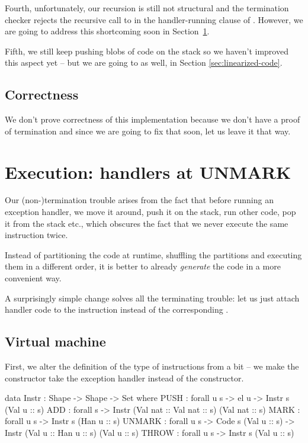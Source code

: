 Fourth, unfortunately, our recursion is still not structural and the
termination checker rejects the recursive call to  in the
handler-running clause of . However, we are going to address
this shortcoming soon in Section~\ref{sec:handlers-at-unmark}.

Fifth, we still keep pushing blobs of code on the stack so we haven't improved
this aspect yet -- but we are going to as well, in Section \ref{sec:linearized-code}.

\subsection{Correctness}

We don't prove correctness of this implementation because we don't
have a proof of termination and since we are going to fix that soon, let us
leave it that way.

\section{Execution: handlers at UNMARK}
\label{sec:handlers-at-unmark}

Our (non-)termination trouble arises from the fact that before running an
exception handler, we move it around, push it on the stack, run other code, pop
it from the stack etc., which obscures the fact that we never execute the same
instruction twice.

Instead of partitioning the code at runtime, shuffling the partitions and
executing them in a different order, it is better to already \emph{generate}
the code in a more convenient way.

A surprisingly simple change solves all the terminating trouble: let us just
attach handler code to the instruction  instead of the
corresponding .


\subsection{Virtual machine}

First, we alter the definition of the type of instructions from
 a bit -- we make the  constructor take
the exception handler instead of the  constructor.

\begin{code}
  data Instr : Shape -> Shape -> Set where
    PUSH : forall {u s} -> el u -> Instr s (Val u :: s)
    ADD : forall {s} -> Instr (Val nat :: Val nat :: s) (Val nat :: s)
    MARK : forall {u s} -> Instr s (Han u :: s)
    UNMARK : forall {u s} -> Code s (Val u :: s)
      -> Instr (Val u :: Han u :: s) (Val u :: s)
    THROW : forall {u s} -> Instr s (Val u :: s)
\end{code}

